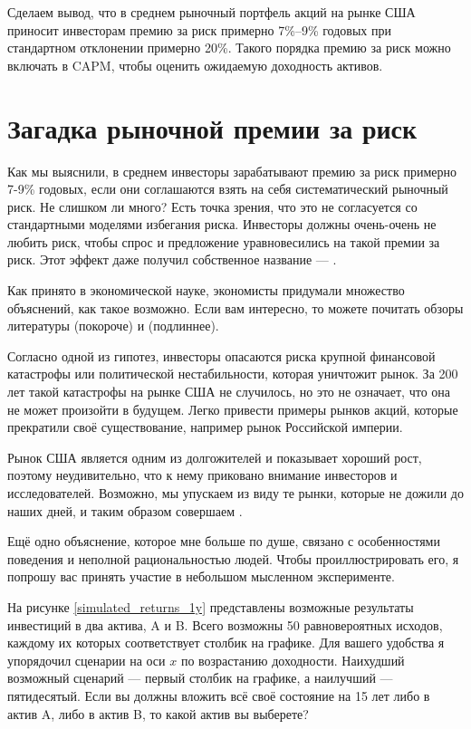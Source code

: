 Сделаем вывод, что в среднем рыночный портфель акций на рынке США приносит инвесторам премию за риск примерно 7\%--9\% годовых при стандартном отклонении примерно 20\%. Такого порядка премию за риск можно включать в CAPM, чтобы оценить ожидаемую доходность активов.

\section*{Загадка рыночной премии за риск}

Как мы выяснили, в среднем инвесторы зарабатывают премию за риск примерно 7-9\%  годовых, если они соглашаются взять на себя систематический рыночный риск. Не слишком ли много? Есть точка зрения, что это не согласуется со стандартными моделями избегания риска. Инвесторы должны очень-очень не любить риск, чтобы спрос и предложение уравновесились на такой премии за риск. Этот эффект даже получил собственное название --- .

Как принято в экономической науке, экономисты придумали множество объяснений, как такое возможно. Если вам интересно, то можете почитать обзоры литературы \cite{siegel1997anomalies} (покороче) и \cite{mehra2007equity} (подлиннее).

Согласно одной из гипотез, инвесторы опасаются риска крупной финансовой катастрофы или политической нестабильности, которая уничтожит рынок. За 200 лет такой катастрофы на рынке США не случилось, но это не означает, что она не может произойти в будущем. Легко привести примеры рынков акций, которые прекратили своё существование, например рынок Российской империи.

Рынок США является одним из долгожителей и показывает хороший рост, поэтому неудивительно, что к нему приковано внимание инвесторов и исследователей. Возможно, мы упускаем из виду те рынки, которые не дожили до наших дней, и таким образом совершаем .

Ещё одно объяснение, которое мне больше по душе, связано с особенностями поведения и неполной рациональностью людей. Чтобы проиллюстрировать его, я попрошу вас принять участие в небольшом мысленном эксперименте.

На рисунке \ref{simulated_returns_1y} представлены возможные результаты инвестиций в два актива, A и B. Всего возможны 50 равновероятных исходов, каждому их которых соответствует столбик на графике. Для вашего удобства я упорядочил сценарии на оси $x$ по возрастанию доходности. Наихудший возможный сценарий --- первый столбик на графике, а наилучший --- пятидесятый. Если вы должны вложить всё своё состояние на 15 лет либо в актив A, либо в актив B, то какой актив вы выберете?

